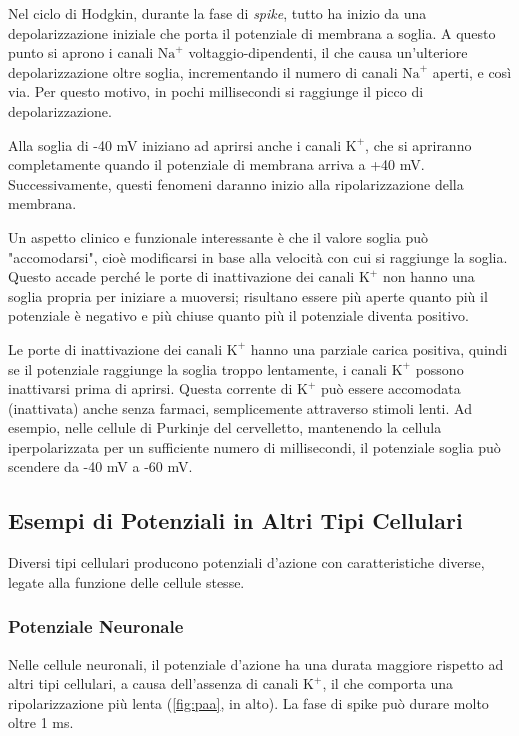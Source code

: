 Nel ciclo di Hodgkin, durante la fase di \textit{spike}, tutto ha inizio da una depolarizzazione iniziale che porta il potenziale di membrana a soglia. A questo punto si aprono i canali \( \text{Na}^+ \) voltaggio-dipendenti, il che causa un'ulteriore depolarizzazione oltre soglia, incrementando il numero di canali \( \text{Na}^+ \) aperti, e così via. Per questo motivo, in pochi millisecondi si raggiunge il picco di depolarizzazione.

Alla soglia di -40 mV iniziano ad aprirsi anche i canali \( \text{K}^+ \), che si apriranno completamente quando il potenziale di membrana arriva a +40 mV. Successivamente, questi fenomeni daranno inizio alla ripolarizzazione della membrana.

Un aspetto clinico e funzionale interessante è che il valore soglia può "accomodarsi", cioè modificarsi in base alla velocità con cui si raggiunge la soglia. Questo accade perché le porte di inattivazione dei canali \( \text{K}^+ \) non hanno una soglia propria per iniziare a muoversi; risultano essere più aperte quanto più il potenziale è negativo e più chiuse quanto più il potenziale diventa positivo.

Le porte di inattivazione dei canali \( \text{K}^+ \) hanno una parziale carica positiva, quindi se il potenziale raggiunge la soglia troppo lentamente, i canali \( \text{K}^+ \) possono inattivarsi prima di aprirsi. Questa corrente di \( \text{K}^+ \) può essere accomodata (inattivata) anche senza farmaci, semplicemente attraverso stimoli lenti. Ad esempio, nelle cellule di Purkinje del cervelletto, mantenendo la cellula iperpolarizzata per un sufficiente numero di millisecondi, il potenziale soglia può scendere da -40 mV a -60 mV.

\subsection{Esempi di Potenziali in Altri Tipi Cellulari}
Diversi tipi cellulari producono potenziali d'azione con caratteristiche diverse, legate alla funzione delle cellule stesse.

\subsubsection*{Potenziale Neuronale}
Nelle cellule neuronali, il potenziale d'azione ha una durata maggiore rispetto ad altri tipi cellulari, a causa dell'assenza di canali \( \text{K}^+ \), il che comporta una ripolarizzazione più lenta (\autoref{fig:paa}, in alto). La fase di spike può durare molto oltre 1 ms.

